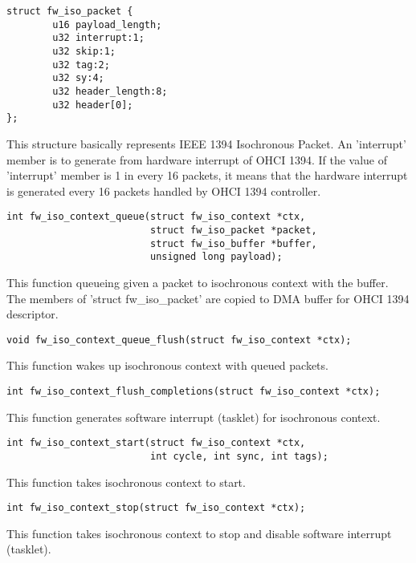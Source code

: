 \documentclass[onecolumn]{article}
\begin{document}
\begin{verbatim}
struct fw_iso_packet {
        u16 payload_length;
        u32 interrupt:1;
        u32 skip:1;
        u32 tag:2;
        u32 sy:4;
        u32 header_length:8;
        u32 header[0];
};
\end{verbatim}

This structure basically represents IEEE 1394 Isochronous Packet. An 'interrupt' member is to generate from hardware interrupt of OHCI 1394. If the value of 'interrupt' member is 1 in every 16 packets, it means that the hardware interrupt is generated every 16 packets handled by OHCI 1394 controller.

\begin{verbatim}
int fw_iso_context_queue(struct fw_iso_context *ctx,
                         struct fw_iso_packet *packet,
                         struct fw_iso_buffer *buffer,
                         unsigned long payload);
\end{verbatim}

This function queueing given a packet to isochronous context with the buffer. The members of 'struct fw\_iso\_packet' are copied to DMA buffer for OHCI 1394 descriptor.

\begin{verbatim}
void fw_iso_context_queue_flush(struct fw_iso_context *ctx);
\end{verbatim}

This function wakes up isochronous context with queued packets.

\begin{verbatim}
int fw_iso_context_flush_completions(struct fw_iso_context *ctx);
\end{verbatim}

This function generates software interrupt (tasklet) for isochronous context.

\begin{verbatim}
int fw_iso_context_start(struct fw_iso_context *ctx,
                         int cycle, int sync, int tags);
\end{verbatim}

This function takes isochronous context to start.

\begin{verbatim}
int fw_iso_context_stop(struct fw_iso_context *ctx);
\end{verbatim}

This function takes isochronous context to stop and disable software interrupt (tasklet).
\end{document}

